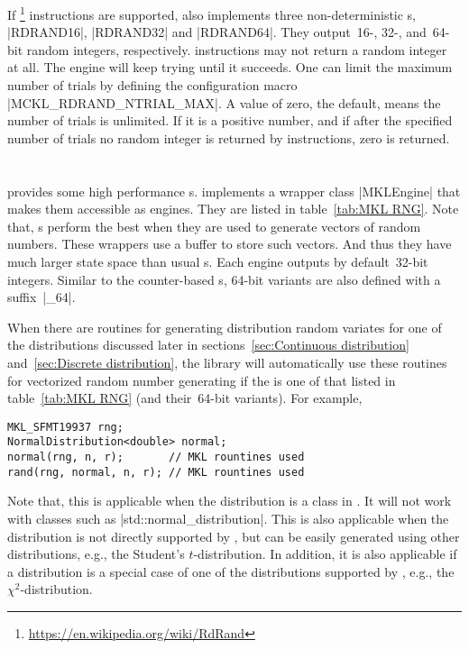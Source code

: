 If \rdrand\footnote{\url{https://en.wikipedia.org/wiki/RdRand}} instructions
are supported, \mckl also implements three non-deterministic \rng{}s,
|RDRAND16|, |RDRAND32| and |RDRAND64|. They output~16-, 32-, and~64-bit random
integers, respectively. \rdrand instructions may not return a random integer at
all. The \rng engine will keep trying until it succeeds. One can limit the
maximum number of trials by defining the configuration macro
|MCKL_RDRAND_NTRIAL_MAX|. A value of zero, the default, means the number of
trials is unlimited. If it is a positive number, and if after the specified
number of trials no random integer is returned by \rdrand instructions, zero is
returned.

\section{\texorpdfstring{\mkl \rng}{MKL RNG}}
\label{sec:MKL RNG}

\mkl provides some high performance \rng{}s. \mckl implements a wrapper class
|MKLEngine| that makes them accessible as \cpp engines. They are listed in
table~\ref{tab:MKL RNG}. Note that, \mkl \rng{}s perform the best when they
are used to generate vectors of random numbers. These wrappers use a buffer to
store such vectors. And thus they have much larger state space than usual
\rng{}s. Each \rng engine outputs by default~32-bit integers. Similar to the
counter-based \rng{}s, 64-bit variants are also defined with a suffix~|_64|.

When there are \mkl routines for generating distribution random variates for
one of the distributions discussed later in sections~\ref{sec:Continuous
distribution} and~\ref{sec:Discrete distribution}, the library will
automatically use these routines for vectorized random number generating if the
\rng is one of that listed in table~\ref{tab:MKL RNG} (and their~64-bit
variants). For example,
\begin{verbatim}
MKL_SFMT19937 rng;
NormalDistribution<double> normal;
normal(rng, n, r);       // MKL rountines used
rand(rng, normal, n, r); // MKL rountines used
\end{verbatim}
Note that, this is applicable when the distribution is a class in \mckl.
It will not work with classes such as |std::normal_distribution|. This is also
applicable when the distribution is not directly supported by \mkl, but can be
easily generated using other distributions, e.g., the Student's
$t$-distribution. In addition, it is also applicable if a distribution is a
special case of one of the distributions supported by \mkl, e.g., the
$\chi^2$-distribution.

